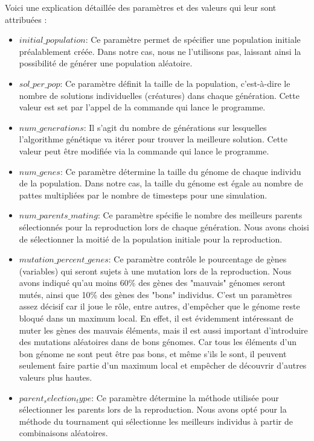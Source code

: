 \documentclass[journal, a4paper]{IEEEtran}
\begin{document}
Voici une explication détaillée des paramètres et des valeurs qui leur sont attribuées :

\begin{itemize}
    \item \texttt{$initial\_population$}: Ce paramètre permet de spécifier une population initiale préalablement créée. Dans notre cas, nous ne l'utilisons pas, laissant ainsi la possibilité de générer une population aléatoire.
    \item \texttt{$sol\_per\_pop$}: Ce paramètre définit la taille de la population, c'est-à-dire le nombre de solutions individuelles (créatures) dans chaque génération. Cette valeur est set par l'appel de la commande qui lance le programme.
    \item \texttt{$num\_generations$}: Il s'agit du nombre de générations sur lesquelles l'algorithme génétique va itérer pour trouver la meilleure solution. Cette valeur peut être modifiée via la commande qui lance le programme.
    \item \texttt{$num\_genes$}: Ce paramètre détermine la taille du génome de chaque individu de la population. Dans notre cas, la taille du génome est égale au nombre de pattes multipliées par le nombre de timesteps pour une simulation.
    \item \texttt{$num\_parents\_mating$}: Ce paramètre spécifie le nombre des meilleurs parents sélectionnés pour la reproduction lors de chaque génération. Nous avons choisi de sélectionner la moitié de la population initiale pour la reproduction.
    \item \texttt{$mutation\_percent\_genes$}: Ce paramètre contrôle le pourcentage de gènes (variables) qui seront sujets à une mutation lors de la reproduction. Nous avons indiqué qu'au moins 60\% des gènes des "mauvais" génomes seront mutés, ainsi que 10\% des gènes des "bons" individus. C'est un paramètres assez décisif car il joue le rôle, entre autres, d'empêcher que le génome reste bloqué dans un maximum local. En effet, il est évidemment intéressant de muter les gènes des mauvais éléments, mais il est aussi important d'introduire des mutations aléatoires dans de bons génomes. Car tous les éléments d'un bon génome ne sont peut être pas bons, et même s'ils le sont, il peuvent seulement faire partie d'un maximum local et empêcher de découvrir d'autres valeurs plus hautes.
    \item \texttt{$parent_selection_type$}: Ce paramètre détermine la méthode utilisée pour sélectionner les parents lors de la reproduction. Nous avons opté pour la méthode du tournament qui sélectionne les meilleurs individus à partir de combinaisons aléatoires. %

\end{itemize}
\end{document}
